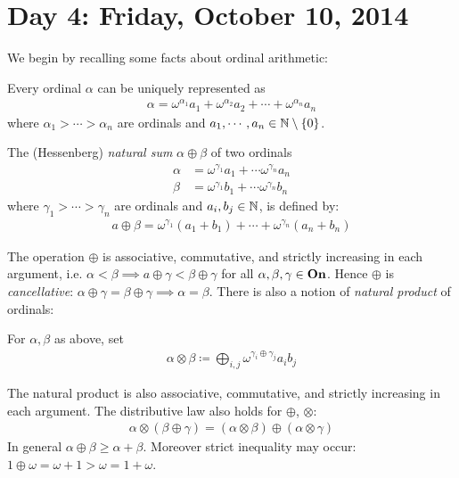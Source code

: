 \section*{Day 4: Friday, October 10, 2014}
We begin by recalling some facts about ordinal arithmetic: 
\begin{theorem}
	Every ordinal $\alpha$ can be uniquely represented as
	\begin{align*}
		\alpha = \omega^{\alpha_1} a_1 + \omega^{\alpha_2}
		a_2 + \cdots + \omega^{\alpha_n} a_n
	\end{align*}
	where $\alpha_1 > \cdots > \alpha_n$ are ordinals and 
	$a_1, \cdots, a_n \in \mathbb{N} \setminus \left\{ 0 \right\}$. 
	\label{}
\end{theorem}
\begin{defn}
	The (Hessenberg) \emph{natural sum} $\alpha \oplus \beta$ of 
	two ordinals
	\begin{align*}
		\alpha &= \omega^{\gamma_1} a_1 + \cdots \omega^{\gamma_n}
		a_n \\
		\beta &= \omega^{\gamma_1} b_1 + \cdots \omega^{\gamma_n} 
		b_n
	\end{align*}
	where $\gamma_1 > \cdots > \gamma_n$ are ordinals and 
	$a_i, b_j \in \mathbb{N}$, is defined by: 
	\begin{align*}
		a \oplus \beta = \omega^{\gamma_1}(a_1 + b_1) + \cdots 
		+ \omega^{\gamma_n}(a_n + b_n)
	\end{align*}
\end{defn}
The operation $\oplus$ is associative, commutative, and strictly increasing 
in each argument, i.e. $\alpha < \beta \implies a \oplus \gamma < \beta \oplus 
\gamma$ for all $\alpha, \beta, \gamma \in \mathbf{On}$. Hence 
$\oplus$ is \emph{cancellative}: $\alpha \oplus \gamma = \beta \oplus 
\gamma \implies \alpha = \beta$. There is also a notion of 
\emph{natural product} of ordinals: 
\begin{defn}
	For $\alpha, \beta$ as above, set 
	\begin{align*}
		\alpha \otimes \beta \coloneq 
		\bigoplus_{i, j}{\omega^{\gamma_i \oplus \gamma_j}a_i 
	b_j}
	\end{align*}
\end{defn}
The natural product is also associative, commutative, and strictly 
increasing in each argument. The distributive law also holds for 
$\oplus$, $\otimes$: 
\begin{align*}
	\alpha \otimes (\beta \oplus \gamma) = (\alpha \otimes \beta) 
	\oplus (\alpha \otimes \gamma)
\end{align*}
In general $\alpha \oplus \beta \geq \alpha + \beta$. Moreover 
strict inequality may occur: $1 \oplus \omega = \omega + 1 > \omega = 
1 + \omega$. 

